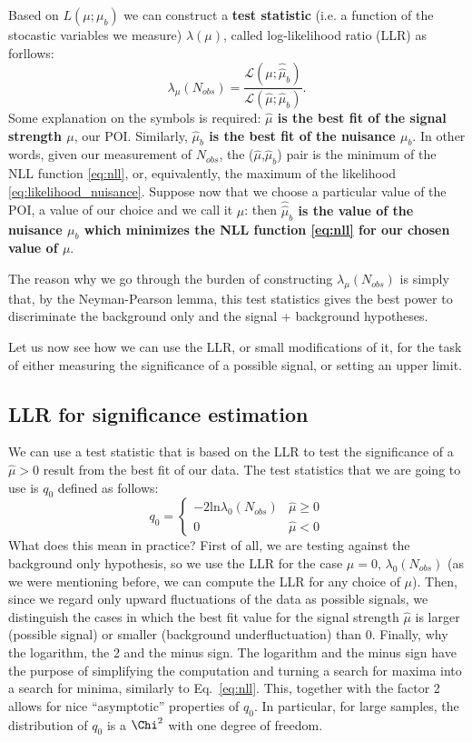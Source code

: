 \documentclass[a4paper,12pt]{article}
\begin{document}
Based on $L(\mu;\mu_b)$ we can construct a {\bf test statistic} (i.e. a
function of the stocastic variables we measure) $\lambda(\mu)$,
called log-likelihood ratio (LLR) as
forllows:
\begin{equation}
\lambda_\mu(N_{obs})=\frac{\mathcal{L}(\mu;\hat{\hat{\mu}}_b)}{\mathcal{L}(\hat{\mu};\hat{\mu}_b)}.
\label{eq:llr}
\end{equation}
Some explanation on the symbols is required:  {\bf $\hat{\mu}$ is the best fit of
the signal strength $\mu$}, our POI. Similarly, {\bf $\hat{\mu}_b$ is the best fit
of the nuisance $\mu_b$}. In other words, given our measurement of $N_{obs}$,
the ($\hat{\mu}$,$\hat{\mu}_b$) pair is the
minimum of the NLL function \ref{eq:nll}, or, equivalently, the maximum of the
likelihood \ref{eq:likelihood_nuisance}. Suppose now that we choose a
particular value of the POI, a value of our choice and we call it $\mu$: then
{\bf $\hat{\hat{\mu}}_b$ is the value of the nuisance $\mu_b$ which minimizes the
NLL function \ref{eq:nll} for our chosen value of $\mu$}.

The reason why we go through the burden of constructing $\lambda_\mu(N_{obs})$
is simply that, by the Neyman-Pearson lemma, this test statistics gives the
best power to discriminate the background only and the signal + background
hypotheses.

Let us now see how we can use the LLR, or small modifications of it, for the
task of either measuring the significance of a possible signal, or setting an
upper limit.

\subsection{LLR for significance estimation}
We can use a test statistic that is based on the LLR to test the significance
of a $\hat{\mu}>0$ result from the best fit of our data. The test statistics
that we are going to use is $q_{0}$ defined as follows:
\begin{equation}
q_0=\begin{cases}
-2\mathrm{ln}\lambda_0(N_{obs}) & \hat{\mu}\geq0 \\
0 & \hat{\mu}<0
\end{cases}
\label{eq:teststat_signif}
\end{equation}
What does this mean in practice? First of all, we are testing against the
background only hypothesis, so we use the LLR for the case $\mu=0$,
$\lambda_0(N_{obs})$ (as we were mentioning before, we can compute the LLR for
any choice of $\mu$).
Then, since we regard only upward fluctuations of the data as possible
signals, we distinguish the cases in which the best fit value for the signal
strength $\hat{\mu}$ is larger (possible signal) or smaller (background
underfluctuation) than 0. Finally, why the logarithm, the 2 and the minus
sign. The logarithm and the minus sign have the purpose of simplifying the
computation and turning a search for maxima into a search for minima,
similarly to Eq.~\ref{eq:nll}. This, together with the factor 2 allows for
nice ``asymptotic'' properties of $q_0$. In particular, for large samples, the
distribution of $q_0$ is a $\Chi^2$ with one degree of freedom.
\end{document}
